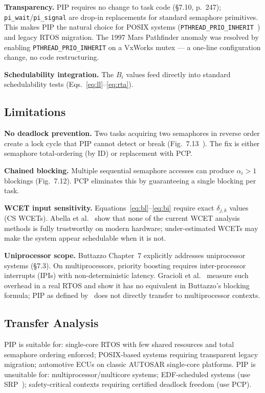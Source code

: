 \documentclass[conference]{IEEEtran}
\begin{document}
\textbf{Transparency.} PIP requires no change to task code
(§7.10, p.~247); \texttt{pi\_wait}/\texttt{pi\_signal} are drop-in
replacements for standard semaphore primitives.
This makes PIP the natural choice for POSIX systems
(\texttt{PTHREAD\_PRIO\_INHERIT}~\cite{Sha1990}) and legacy RTOS migration.
The 1997 Mars Pathfinder anomaly was resolved by enabling
\texttt{PTHREAD\_PRIO\_INHERIT} on a VxWorks mutex --- a one-line
configuration change, no code restructuring.

\textbf{Schedulability integration.} The $B_i$ values feed directly
into standard schedulability tests (Eqs.~\ref{eq:ll}--\ref{eq:rta}).

\subsection{Limitations}

\textbf{No deadlock prevention.} Two tasks acquiring two semaphores
in reverse order create a lock cycle that PIP cannot detect or break
(Fig.~7.13~\cite{Buttazzo2011}). The fix is either semaphore
total-ordering (by ID) or replacement with PCP.

\textbf{Chained blocking.} Multiple sequential semaphore accesses
can produce $\alpha_i > 1$ blockings (Fig.~7.12). PCP eliminates
this by guaranteeing a single blocking per task.

\textbf{WCET input sensitivity.} Equations~\ref{eq:bl}--\ref{eq:bi}
require exact $\delta_{j,k}$ values (CS WCETs).
Abella et al.~\cite{Abella2015} show that none of the current WCET
analysis methods is fully trustworthy on modern hardware;
under-estimated WCETs may make the system appear schedulable when it
is not.

\textbf{Uniprocessor scope.} Buttazzo Chapter~7 explicitly addresses
uniprocessor systems (§7.3).
On multiprocessors, priority boosting requires inter-processor
interrupts (IPIs) with non-deterministic latency.
Gracioli et al.~\cite{Gracioli2013} measure such overhead in a real
RTOS and show it has no equivalent in Buttazzo's blocking formula;
PIP as defined by~\cite{Sha1990} does not directly transfer to
multiprocessor contexts.

\subsection{Transfer Analysis}

PIP is suitable for: single-core RTOS with few shared resources and
total semaphore ordering enforced; POSIX-based systems requiring
transparent legacy migration; automotive ECUs on classic AUTOSAR
single-core platforms.
PIP is unsuitable for: multiprocessor/multicore systems; EDF-scheduled
systems (use SRP~\cite{Baker1991}); safety-critical contexts requiring
certified deadlock freedom (use PCP).
\end{document}
